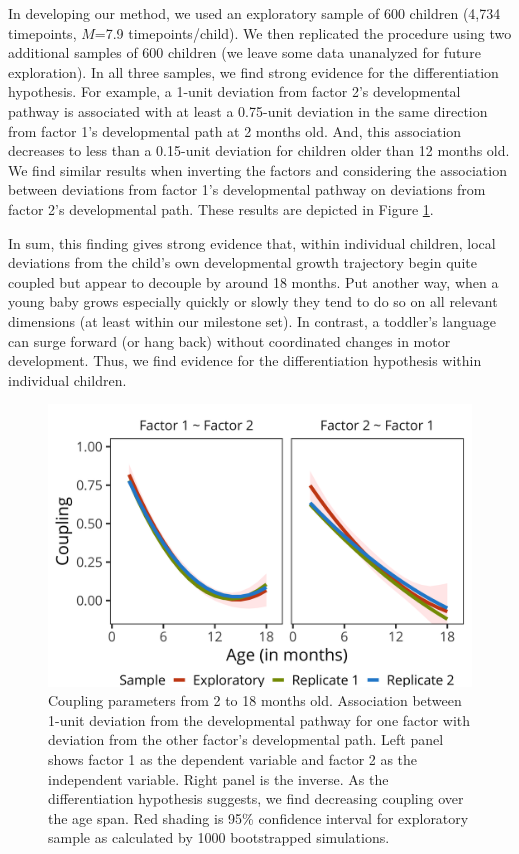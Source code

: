 \documentclass[man]{apa7}
\begin{document}
In developing our method, we used an exploratory sample of 600 children (4,734 timepoints, $M$=7.9 timepoints/child). We then replicated the procedure using two additional samples of 600 children (we leave some data unanalyzed for future exploration). In all
three samples, we find strong evidence for the differentiation
hypothesis. For example, a 1-unit deviation from factor 2's
developmental pathway is associated with at least a 0.75-unit deviation
in the same direction from factor 1's developmental path at 2 months
old. And, this association decreases to less than a 0.15-unit deviation
for children older than 12 months old. We find similar results when
inverting the factors and considering the association between deviations
from factor 1's developmental pathway on deviations from factor 2's
developmental path. These results are depicted in Figure
\ref{fig:study2results}. 

In sum, this finding gives strong evidence that, within individual children, local deviations from the child's own developmental growth trajectory begin quite coupled but appear to decouple by around 18 months. Put another way, when a young baby grows especially quickly or slowly they tend to do so on all relevant dimensions (at least within our milestone set). In contrast, a toddler's language can surge forward (or hang back) without coordinated changes in motor development. Thus, we find evidence for the differentiation hypothesis within individual children.

\begin{figure}
\centering
\includegraphics[width=1\columnwidth]{figures/study2results.png}
\caption{Coupling parameters from 2 to 18 months old. Association between 1-unit deviation from the developmental pathway for one factor with deviation from the other factor’s developmental path. Left panel shows factor 1 as the dependent variable and factor 2 as the independent variable. Right panel is the inverse. As the differentiation hypothesis suggests, we find decreasing coupling over the age span. Red shading is 95\% confidence interval for exploratory sample as calculated by 1000 bootstrapped simulations.}
\label{fig:study2results}
\end{figure}
\end{document}
